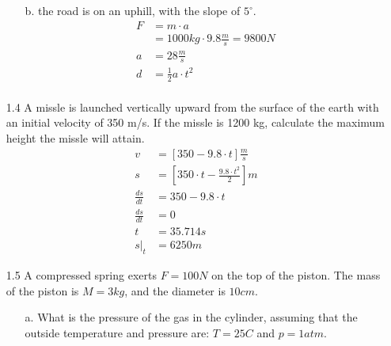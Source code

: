 \documentclass[10pt, a4paper]{article}
\begin{document}
\begin{enumerate}
\begin{enumerate}
      \item[b.] the road is on an uphill, with the slope of $5^{\circ}$.
        \begin{align*}
         F &= m \cdot a \\
         &= 1000kg \cdot 9.8\frac{m}{s} = 9800 N \\
         a &= 28\frac{m}{s} \\
         d &= \frac{1}{2}a\cdot t^2 \\
        \end{align*}
    \end{enumerate}
  \item[1.4] A missle is launched vertically upward from the surface of the earth with an initial velocity of 350 m/s. If the missle is 1200 kg, calculate the maximum height the missle will attain.
    \begin{align*}
      v &= [350 - 9.8\cdot t]\frac{m}{s} \\
      s &= [350\cdot t - \frac{9.8\cdot t^2}{2}]m \\
      \frac{ds}{dt} &= 350 - 9.8 \cdot t \\
      \frac{ds}{dt} &= 0 \\
      t &= 35.714 s \\
      s |_{t} &= 6250m
    \end{align*}

  \item[1.5] A compressed spring exerts $F=100N$ on the top of the piston. The mass of the piston is $M=3kg$, and the diameter is
    $10 cm$.
    \begin{enumerate}
      \item[a.] What is the pressure of the gas in the cylinder, assuming that the outside temperature and pressure are:
        $T=25C$ and $p=1atm$.

    \end{enumerate}

\end{enumerate}
\end{document}

